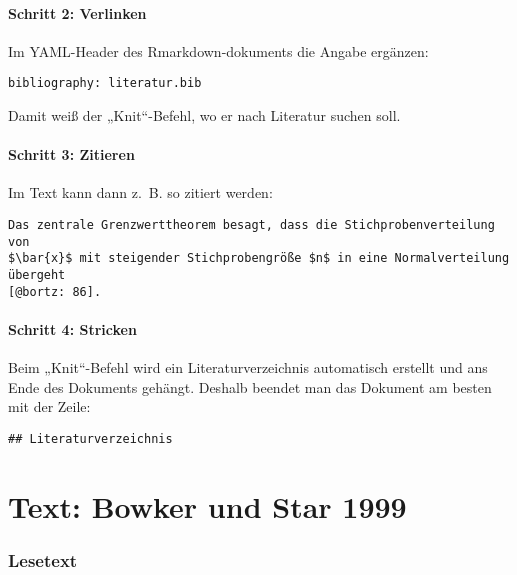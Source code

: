 \documentclass[
  ngerman,
]{article}
\begin{document}
\hypertarget{schritt-2-verlinken}{%
\paragraph{Schritt 2: Verlinken}\label{schritt-2-verlinken}}

Im YAML-Header des Rmarkdown-dokuments die Angabe ergänzen:

\begin{verbatim}
bibliography: literatur.bib
\end{verbatim}

Damit weiß der „Knit``-Befehl, wo er nach Literatur suchen soll.

\hypertarget{schritt-3-zitieren}{%
\paragraph{Schritt 3: Zitieren}\label{schritt-3-zitieren}}

Im Text kann dann z.~B. so zitiert werden:

\begin{verbatim}
Das zentrale Grenzwerttheorem besagt, dass die Stichprobenverteilung von
$\bar{x}$ mit steigender Stichprobengröße $n$ in eine Normalverteilung übergeht
[@bortz: 86].
\end{verbatim}

\hypertarget{schritt-4-stricken}{%
\paragraph{Schritt 4: Stricken}\label{schritt-4-stricken}}

Beim „Knit``-Befehl wird ein Literaturverzeichnis automatisch erstellt und ans Ende des Dokuments gehängt. Deshalb beendet man das Dokument am besten mit der Zeile:

\begin{verbatim}
## Literaturverzeichnis
\end{verbatim}

\hypertarget{text-bowker-und-star-1999}{%
\section{Text: Bowker und Star 1999}\label{text-bowker-und-star-1999}}

\hypertarget{lesetext-4}{%
\subsubsection{Lesetext}\label{lesetext-4}}
\end{document}
